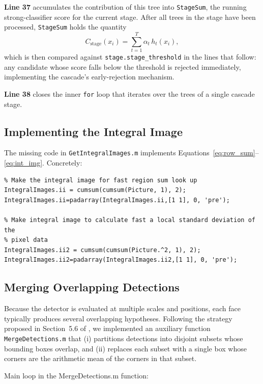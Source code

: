 \documentclass{article}
\begin{document}
\noindent\textbf{Line 37} accumulates the contribution of this tree
into \texttt{StageSum}, the running strong-classifier score for the
current stage. After all trees in the stage have been processed,
\texttt{StageSum} holds the quantity
\begin{equation}
    C_{\text{stage}}(x_i) = \sum_{t=1}^{T} \alpha_t \, h_t(x_i),
\end{equation}
which is then compared against \texttt{stage.stage\_threshold} in
the lines that follow: any candidate whose score falls below the
threshold is rejected immediately, implementing the cascade's
early-rejection mechanism.

\noindent\textbf{Line 38} closes the inner \texttt{for} loop that
iterates over the trees of a single cascade stage.
 
\subsection{Implementing the Integral Image}
 
The missing code in \texttt{GetIntegralImages.m} implements
Equations~\eqref{eq:row_sum}--\eqref{eq:int_img}. Concretely:

\begin{verbatim}
% Make the integral image for fast region sum look up
IntegralImages.ii = cumsum(cumsum(Picture, 1), 2); 
IntegralImages.ii=padarray(IntegralImages.ii,[1 1], 0, 'pre');

% Make integral image to calculate fast a local standard deviation of the
% pixel data
IntegralImages.ii2 = cumsum(cumsum(Picture.^2, 1), 2);
IntegralImages.ii2=padarray(IntegralImages.ii2,[1 1], 0, 'pre');
\end{verbatim}

\subsection{Merging Overlapping Detections}

Because the detector is evaluated at multiple scales and positions,
each face typically produces several overlapping hypotheses.
Following the strategy proposed in Section~5.6 of
\cite{viola2004robust}, we implemented an auxiliary function
\texttt{MergeDetections.m} that (i) partitions detections into
disjoint subsets whose bounding boxes overlap, and (ii) replaces each
subset with a single box whose corners are the arithmetic mean of the
corners in that subset.

Main loop in the MergeDetections.m function:
\end{document}
